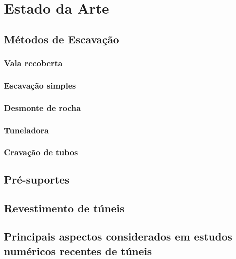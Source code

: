 \chapter{Estado da Arte}




\section{Métodos de Escavação}


\subsection{Vala recoberta}


\subsection{Escavação simples}


\subsection{Desmonte de rocha}

\subsection{Tuneladora}


\subsection{Cravação de tubos}



\section{Pré-suportes}



\section{Revestimento de túneis}



\section{Principais aspectos considerados em estudos numéricos recentes de túneis}




